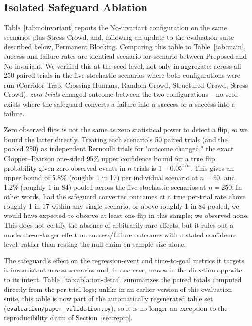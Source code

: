\documentclass[conference,letterpaper,10pt]{ieeeconf}
\begin{document}
\subsection{Isolated Safeguard Ablation}
\label{sec:isolated-ablation}
Table~\ref{tab:noinvariant} reports the No-invariant configuration on the
same scenarios plus Stress Crowd, and, following an update to the
evaluation suite described below, Permanent Blocking. Comparing this table
to Table~\ref{tab:main}, success and failure rates are identical
scenario-for-scenario between Proposed and No-invariant. We verified this
at the seed level, not only in aggregate: across all 250 paired trials in
the five stochastic scenarios where both configurations were run (Corridor
Trap, Crossing Humans, Random Crowd, Structured Crowd, Stress Crowd),
\emph{zero trials} changed outcome between the two configurations -- no
seed exists where the safeguard converts a failure into a success or a
success into a failure.

Zero observed flips is not the same as zero statistical power to detect a
flip, so we bound the latter directly. Treating each scenario's 50 paired
trials (and the pooled 250) as independent Bernoulli trials for
"outcome changed," the exact Clopper--Pearson one-sided 95\% upper
confidence bound for a true flip probability given zero observed events
in $n$ trials is $1 - 0.05^{1/n}$. This gives an upper bound of
5.8\% (roughly 1 in 17) per individual scenario at $n=50$, and 1.2\%
(roughly 1 in 84) pooled across the five stochastic scenarios at
$n=250$. In other words, had the safeguard converted outcomes at a true
per-trial rate above roughly 1 in 17 within any single scenario, or above
roughly 1 in 84 pooled, we would have expected to observe at least one
flip in this sample; we observed none. This does not certify the absence
of arbitrarily rare effects, but it rules out a moderate-or-larger
effect on success/failure outcomes with a stated confidence level, rather
than resting the null claim on sample size alone.



The safeguard's effect on the regression-event and time-to-goal metrics it
targets is inconsistent across scenarios and, in one case, moves in the
direction opposite to its intent. Table~\ref{tab:ablation-detail}
summarizes the paired totals computed directly from the per-trial logs;
unlike in an earlier version of this evaluation suite, this table is now
part of the automatically regenerated table set
(\texttt{evaluation/paper\_validation.py}), so it is no longer an
exception to the reproducibility claim of Section~\ref{sec:repro}.
\end{document}
